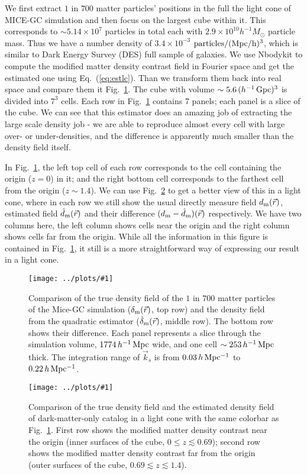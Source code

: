 \documentclass[prd,amsmath,amssymb,floatfix,superscriptaddress,nofootinbib,twocolumn]{revtex4-1}
\newcommand{\vrr}{\vec{r}}
\newcommand{\vk}{\vec{k}}
\newcommand{\ec}[1]{Eq.~(\ref{eq:#1})}
\newcommand{\rf}[1]{\ref{fig:#1}}
\newcommand{\sfig}[2]{
\texttt{[image: ../plots/\#1]}
        }
\newcommand{\Sfig}[2]{
   \begin{figure}[thbp]
   \begin{center}
    \sfig{../plots/#1.pdf}{\columnwidth}
    \caption{{\small #2}}
    \label{fig:#1}
     \end{center}
   \end{figure}
}
\begin{document}
We first extract $1$ in $700$  matter particles' positions in the full the light cone of MICE-GC simulation and then focus on the largest cube within it. This corresponds to $\sim 5.14\times 10^{7}$ particles in total each with $2.9\times 10^{10} h^{-1}M_{\odot}$ particle mass. Thus we have a number density of $3.4\times 10^{-3}$ $\rm particles/(Mpc/h)^3$, which is similar to Dark Energy Survey (DES) \cite{DES:2016DES} full sample of galaxies. We use Nbodykit \cite{Hand:2018nby} to compute the modified matter density contrast field in Fourier space and get the estimated one using \ec{estlc}. Than we transform them back into real space and compare them it Fig.~\rf{real_dm}. The cube with volume $\sim5.6\,(h^{-1}\,\rm Gpc)^3$ is divided into $7^3$ cells. Each row in Fig.~\rf{real_dm} contains 7 panels; each panel is a slice of the cube. We can see that this estimator does an amazing job of extracting the large scale density job - we are able to reproduce almost every cell with large over- or under-densities, and the difference is apparently much smaller than the density field itself.

In Fig.~\rf{real_dm}, the left top cell of each row corresponds to the cell containing the origin ($z=0$) in it; and the right bottom cell corresponds to the farthest cell from the origin ($z\sim 1.4$). We can use Fig.~\rf{cube_dm} to get a better view of this in a light cone, where in each row we still show the usual directly measure field $d_{\rm m}(\vrr)$, estimated field $\hat{d}_{\rm m}(\vrr)$ and their difference $(d_{\rm m}-\hat{d}_{\rm m})(\vrr)$ respectively. We have two columns here, the left column shows cells near the origin and the right column shows cells far from the origin. While all the information in this figure is contained in Fig.~\rf{real_dm}, it still is a more straightforward way of expressing our result in a light cone. 


\Sfig{real_dm}{Comparison of the true density field of the $1$ in $700$ matter particles of the Mice-GC simulation ($\delta_{\rm m}(\vrr)$, top row) and the density field from the quadratic estimator ($\hat{\delta}_{\rm m}(\vrr)$, middle row). The bottom row shows their difference. Each panel represents a slice through the simulation volume, $1774\,h^{-1}\rm \, Mpc$ wide, and one cell $\sim 253\,h^{-1}\rm \, Mpc$ thick. The integration range of $\vk_{s}$ is from $0.03\, h \rm \, Mpc^{-1}$ to $0.22\, h \rm \, Mpc^{-1}$.}
\Sfig{cube_dm}{Comparison of the true density field and the estimated density field of dark-matter-only catalog in a light cone with the same colorbar as Fig.~\rf{real_dm}. First row shows the modified matter density contrast near the origin (inner surfaces of the cube, $0\leqslant z \lesssim 0.69$); second row shows the modified matter density contrast far from the origin (outer surfaces of the cube, $0.69\lesssim z \lesssim 1.4$).}
\end{document}
